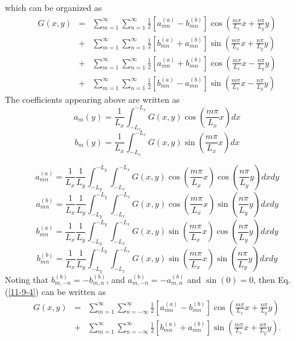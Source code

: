 \documentclass{article}
\begin{document}
which can be organized as
\begin{eqnarray}
  G (x, y) & = & \sum_{m = 1}^{\infty} \sum_{n = 1}^{\infty} \frac{1}{2} [a_{m
  n}^{(a)} - b_{m n}^{(b)}] \cos \left( \frac{m \pi}{L_x} x + \frac{n
  \pi}{L_y} y \right) \nonumber\\
  & + & \sum_{m = 1}^{\infty} \sum_{n = 1}^{\infty} \frac{1}{2} [b_{m
  n}^{(a)} + a_{m n}^{(b)}] \sin \left( \frac{m \pi}{L_x} x + \frac{n
  \pi}{L_y} y \right) \nonumber\\
  & + & \sum_{m = 1}^{\infty} \sum_{n = 1}^{\infty} \frac{1}{2} [a_{m
  n}^{(a)} + b_{m n}^{(b)}] \cos \left( \frac{m \pi}{L_x} x - \frac{n
  \pi}{L_y} y \right) \nonumber\\
  & + & \sum_{m = 1}^{\infty} \sum_{n = 1}^{\infty} \frac{1}{2} [b_{m
  n}^{(a)} - a_{m n}^{(b)}] \sin \left( \frac{m \pi}{L_x} x - \frac{n
  \pi}{L_y} y \right)  \label{11-9-4}
\end{eqnarray}
The coefficients appearing above are written as
\begin{equation}
  a_m (y) = \frac{1}{L_x} \int_{- L_x}^{- L_x} G (x, y) \cos \left( \frac{m
  \pi}{L_x} x \right) d x
\end{equation}
\begin{equation}
  b_m (y) = \frac{1}{L_x} \int_{- L_x}^{- L_x} G (x, y) \sin \left( \frac{m
  \pi}{L_x} x \right) d x
\end{equation}

\begin{equation}
  a_{m n}^{(a)} = \frac{1}{L_x}  \frac{1}{L_y} \int_{- L_y}^{- L_y} \int_{-
  L_x}^{- L_x} G (x, y) \cos \left( \frac{m \pi}{L_x} x \right) \cos \left(
  \frac{n \pi}{L_y} y \right) d x d y
\end{equation}
\begin{equation}
  a_{m n}^{(b)} = \frac{1}{L_x}  \frac{1}{L_y} \int_{- L_y}^{- L_y} \int_{-
  L_x}^{- L_x} G (x, y) \cos \left( \frac{m \pi}{L_x} x \right) \sin \left(
  \frac{n \pi}{L_y} y \right) d x d y
\end{equation}
\begin{equation}
  b_{m n}^{(a)} = \frac{1}{L_x} \frac{1}{L_y} \int_{- L_y}^{- L_y} \int_{-
  L_x}^{- L_x} G (x, y) \sin \left( \frac{m \pi}{L_x} x \right) \cos \left(
  \frac{n \pi}{L_y} y \right) d x d y
\end{equation}
\begin{equation}
  b_{m n}^{(b)} = \frac{1}{L_x} \frac{1}{L_y} \int_{- L_y}^{- L_y} \int_{-
  L_x}^{- L_x} G (x, y) \sin \left( \frac{m \pi}{L_x} x \right) \sin \left(
  \frac{n \pi}{L_y} y \right) d x d y
\end{equation}
Noting that $b_{m, - n}^{(b)} = - b_{m, n}^{(b)}$, and $a_{m, - n}^{(b)} = -
a_{m, n}^{(b)}$ and $\sin (0) = 0$, then Eq. (\ref{11-9-4}) can be written as
\begin{eqnarray*}
  G (x, y) & = & \sum_{m = 1}^{\infty} \sum_{n = - \infty}^{\infty}
  \frac{1}{2} [a_{m n}^{(a)} - b_{m n}^{(b)}] \cos \left( \frac{m \pi}{L_x} x
  + \frac{n \pi}{L_y} y \right)\\
  & + & \sum_{m = 1}^{\infty} \sum_{n = - \infty}^{\infty} \frac{1}{2} [b_{m
  n}^{(a)} + a_{m n}^{(b)}] \sin \left( \frac{m \pi}{L_x} x + \frac{n
  \pi}{L_y} y \right) .
\end{eqnarray*}
\end{document}
